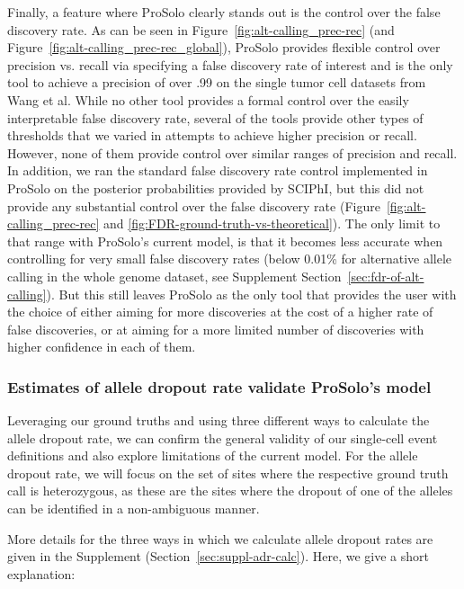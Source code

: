 \documentclass[12pt,inline]{wlscirep}
\begin{document}
Finally, a feature where ProSolo clearly stands out is the control over the false discovery rate.
As can be seen in Figure~\ref{fig:alt-calling_prec-rec} (and Figure~\ref{fig:alt-calling_prec-rec_global}), ProSolo provides flexible control over precision vs. recall via specifying a false discovery rate of interest and is the only tool to achieve a precision of over .99 on the single tumor cell datasets from Wang et al\cite{wang_clonal_2014}.
While no other tool provides a formal control over the easily interpretable false discovery rate, several of the tools provide other types of thresholds that we varied in attempts to achieve higher precision or recall.
However, none of them provide control over similar ranges of precision and recall.
In addition, we ran the standard false discovery rate control implemented in ProSolo on the posterior probabilities provided by SCIPhI, but this did not provide any substantial control over the false discovery rate (Figure~\ref{fig:alt-calling_prec-rec} and \ref{fig:FDR-ground-truth-vs-theoretical}).
The only limit to that range with ProSolo's current model, is that it becomes less accurate when controlling for very small false discovery rates (below 0.01\% for alternative allele calling in the whole genome dataset, see Supplement Section~\ref{sec:fdr-of-alt-calling}).
But this still leaves ProSolo as the only tool that provides the user with the choice of either aiming for more discoveries at the cost of a higher rate of false discoveries, or at aiming for a more limited number of discoveries with higher confidence in each of them.

\subsubsection{Estimates of allele dropout rate validate ProSolo's model}

Leveraging our ground truths and using three different ways to calculate the allele dropout rate, we can confirm the general validity of our single-cell event definitions and also explore limitations of the current model.
For the allele dropout rate, we will focus on the set of sites where the respective ground truth call is heterozygous, as these are the sites where the dropout of one of the alleles can be identified in a non-ambiguous manner.

More details for the three ways in which we calculate allele dropout rates are given in the Supplement (Section~\ref{sec:suppl-adr-calc}).
Here, we give a short explanation:
\end{document}
